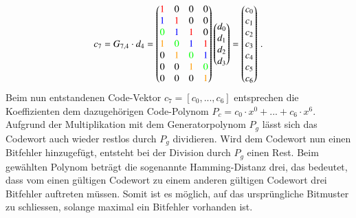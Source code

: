 \[
    c_7=G_{7,4} \cdot d_4=
    \begin{pmatrix}
            \textcolor{red}{1} &                    0  &                    0  &                    0  \\
           \textcolor{blue}{1} &    \textcolor{red}{1} &                    0  &                    0  \\
          \textcolor{green}{0} &   \textcolor{blue}{1} &    \textcolor{red}{1} &                    0  \\
         \textcolor{orange}{1} &  \textcolor{green}{0} &   \textcolor{blue}{1} &    \textcolor{red}{1} \\
                            0  & \textcolor{orange}{1} &  \textcolor{green}{0} &   \textcolor{blue}{1} \\
                            0  &                    0  & \textcolor{orange}{1} &  \textcolor{green}{0} \\
                            0  &                    0  &                    0  & \textcolor{orange}{1} 
    \end{pmatrix}
    \begin{pmatrix}
        d_0\\        
        d_1\\
        d_2\\
        d_3
    \end{pmatrix}
    =
    \begin{pmatrix}
        c_0\\        
        c_1\\
        c_2\\
        c_3\\
        c_4\\
        c_5\\
        c_6\\
    \end{pmatrix}\,.
\]
Beim nun entstandenen Code-Vektor $c_7=[c_0, ..., c_6]$ entsprechen die Koeffizienten dem dazugehörigen Code-Polynom $P_c=c_0\cdot x^0+...+c_6\cdot x^6$.
Aufgrund der Multiplikation mit dem Generatorpolynom $P_g$ lässt sich das Codewort auch wieder restlos durch $P_g$ dividieren.
Wird dem Codewort nun einen Bitfehler hinzugefügt, entsteht bei der Division durch $P_g$ einen Rest.
Beim gewählten Polynom beträgt die sogenannte Hamming-Distanz drei, das bedeutet,
dass vom einen gültigen Codewort zu einem anderen gültigen Codewort drei Bitfehler auftreten müssen.
Somit ist es möglich, auf das ursprüngliche Bitmuster zu schliessen, solange maximal ein Bitfehler vorhanden ist.
